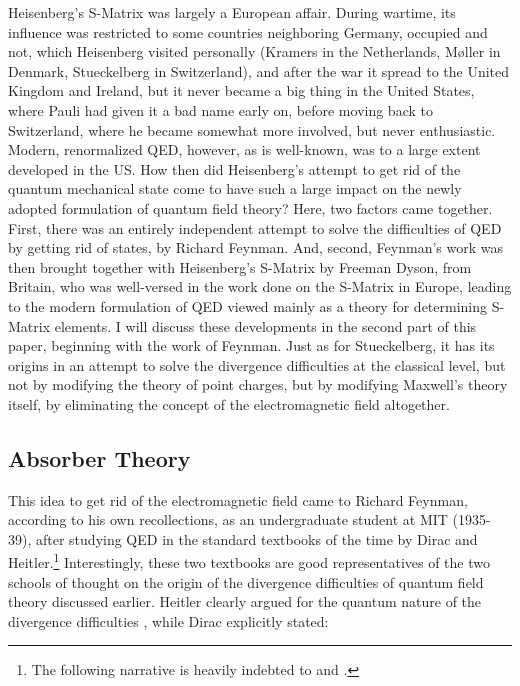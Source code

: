 \documentclass[12pt,a4paper]{article}
\begin{document}
Heisenberg's S-Matrix was largely a European affair. During wartime, its influence was restricted to some countries neighboring Germany, occupied and not, which Heisenberg visited personally (Kramers in the Netherlands, M\o ller in Denmark, Stueckelberg in Switzerland), and after the war it spread to the United Kingdom and Ireland, but it never became a big thing in the United States, where Pauli had given it a bad name early on, before moving back to Switzerland, where he became somewhat more involved, but never enthusiastic. Modern, renormalized QED, however, as is well-known, was to a large extent developed in the US. How then did Heisenberg's attempt to get rid of the quantum mechanical state come to have such a large impact on the newly adopted formulation of quantum field theory? Here, two factors came together. First, there was an entirely independent attempt to solve the difficulties of QED by getting rid of states, by Richard Feynman. And, second, Feynman's work was then brought together with Heisenberg's S-Matrix by Freeman Dyson, from Britain, who was well-versed in the work done on the S-Matrix in Europe, leading to the modern formulation of QED viewed mainly as a theory for determining S-Matrix elements. I will discuss these developments in the second part of this paper, beginning with the work of Feynman. Just as for Stueckelberg, it has its origins in an attempt to solve the divergence difficulties at the classical level, but not by modifying the theory of point charges, but by modifying Maxwell's theory itself, by eliminating the concept of the electromagnetic field altogether.

\subsection{Absorber Theory}

This idea to get rid of the electromagnetic field came to Richard Feynman, according to his own recollections, as an undergraduate student at MIT (1935-39), after studying QED in the standard textbooks of the time by Dirac and Heitler.\footnote{The following narrative is heavily indebted to \citep{mehra_1994_the-beat} and \citep{schweber_1994_qed}.} Interestingly, these two textbooks are good representatives of the two schools of thought on the origin of the divergence difficulties of quantum field theory discussed earlier. Heitler clearly argued for the quantum nature of the divergence difficulties \citep[p. 183]{heitler_1936_the-quantum}, while Dirac explicitly stated:
\end{document}
